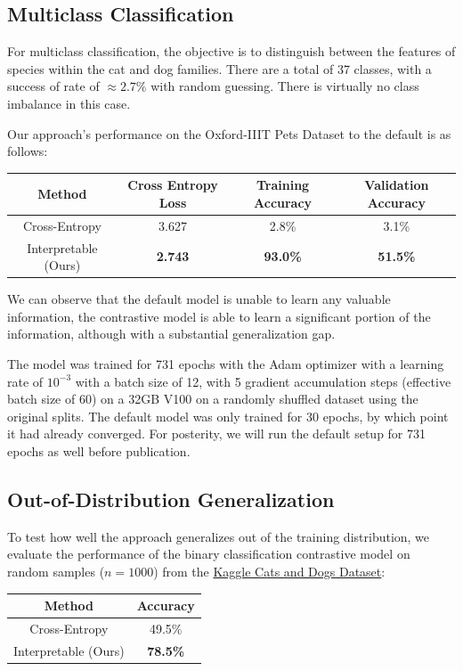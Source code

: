 \documentclass{article}
\begin{document}
\subsection{Multiclass Classification}

For multiclass classification, the objective is to distinguish between the features of species within the cat and dog families. There are a total of 37 classes, with a success of rate of $\approx 2.7\%$ with random guessing. There is virtually no class imbalance in this case.

Our approach's performance on the Oxford-IIIT Pets Dataset to the default is as follows:

\begin{table}[h]
	\centering
	\begin{tabular}{c|ccc}
		\toprule
		\textbf{Method}  & \textbf{Cross Entropy Loss}  & \textbf{Training Accuracy}   & \textbf{Validation Accuracy} \\
		\midrule
		Cross-Entropy & 3.627 & 2.8\% & 3.1\% \\
		Interpretable (Ours) & \bf 2.743 & \bf 93.0\% & \bf 51.5\% \\
		\bottomrule
	\end{tabular}
\end{table}

We can observe that the default model is unable to learn any valuable information, the contrastive model is able to learn a significant portion of the information, although with a substantial generalization gap.

The model was trained for 731 epochs with the Adam optimizer with a learning rate of $10^{-3}$ with a batch size of 12, with 5 gradient accumulation steps (effective batch size of 60) on a 32GB V100 on a randomly shuffled dataset using the original splits. The default model was only trained for 30 epochs, by which point it had already converged. For posterity, we will run the default setup for 731 epochs as well before publication.

\subsection{Out-of-Distribution Generalization}

To test how well the approach generalizes out of the training distribution, we evaluate the performance of the binary classification contrastive model on random samples ($n=1000$) from the \href{https://www.microsoft.com/en-us/download/details.aspx?id=54765}{Kaggle Cats and Dogs Dataset}:
\begin{table}[h]
	\centering
	\begin{tabular}{c|c}
		\toprule
		\textbf{Method} & \textbf{Accuracy} \\
		\midrule
		Cross-Entropy & 49.5\% \\
		Interpretable (Ours) & \bf 78.5\% \\
		\bottomrule
	\end{tabular}
\end{table}
\end{document}
